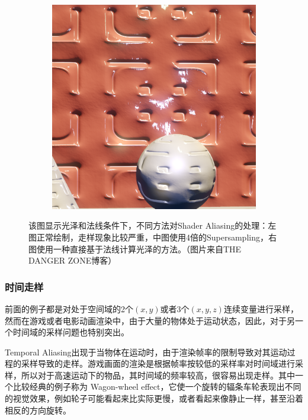 \begin{figure}
\begin{fullwidth}
\begin{subfigure}[b]{0.32\thewidth}
	\end{subfigure}
	\begin{subfigure}[b]{0.32\thewidth}
		\includegraphics[width=1.\textwidth]{figures/intro/specaliasing_clean}
	\end{subfigure}
\caption{该图显示光泽和法线条件下，不同方法对Shader Aliasing的处理：左图正常绘制，走样现象比较严重，中图使用4倍的Supersampling，右图使用一种直接基于法线计算光泽的方法。（图片来自THE DANGER ZONE博客）}
\label{f:intro-shader-aliasing}
\end{fullwidth}
\end{figure}




\subsubsection{时间走样}
前面的例子都是对处于空间域的2个$(x,y)$或者3个$(x,y,z)$连续变量进行采样，然而在游戏或者电影动画渲染中，由于大量的物体处于运动状态，因此，对于另一个时间域的采样问题也特别突出。

Temporal Aliasing出现于当物体在运动时，由于渲染帧率的限制导致对其运动过程的采样导致的走样。游戏画面的渲染是根据帧率按较低的采样率对时间域进行采样，所以对于高速运动下的物品，其时间域的频率较高，很容易出现走样。其中一个比较经典的例子称为 Wagon-wheel effect，它使一个旋转的辐条车轮表现出不同的视觉效果，例如轮子可能看起来比实际更慢，或者看起来像静止一样，甚至沿着相反的方向旋转。

